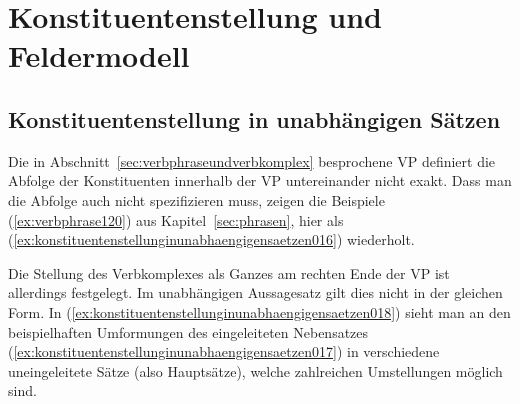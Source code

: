 

\section{Konstituentenstellung und Feldermodell}
\label{sec:konstituentenstellungundfeldermodell}

\subsection{Konstituentenstellung in unabhängigen Sätzen}
\label{sec:konstituentenstellunginunabhaengigensaetzen}

Die in Abschnitt~\ref{sec:verbphraseundverbkomplex} besprochene VP definiert die Abfolge der Konstituenten innerhalb der VP untereinander nicht exakt.
Dass man die Abfolge auch nicht spezifizieren muss, zeigen die Beispiele (\ref{ex:verbphrase120}) aus Kapitel~\ref{sec:phrasen}, hier als (\ref{ex:konstituentenstellunginunabhaengigensaetzen016}) wiederholt.

\begin{exe}
  \ex\label{ex:konstituentenstellunginunabhaengigensaetzen016}
  \begin{xlist}
    \ex{\ThePhrasenExOne}
    \ex{\ThePhrasenExTwo}
  \end{xlist}
\end{exe}

Die Stellung des Verbkomplexes als Ganzes am rechten Ende der VP ist allerdings festgelegt.
Im unabhängigen Aussagesatz gilt dies nicht in der gleichen Form.
In (\ref{ex:konstituentenstellunginunabhaengigensaetzen018}) sieht man an den beispielhaften Umformungen des eingeleiteten Nebensatzes (\ref{ex:konstituentenstellunginunabhaengigensaetzen017}) in verschiedene uneingeleitete Sätze (also Hauptsätze), welche zahlreichen Umstellungen möglich sind.

